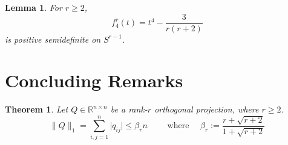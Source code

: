 \documentclass[10pt,a4paper]{amsart}
\newtheorem{lemma}{Lemma}
\newtheorem{theorem}{Theorem}
\newcommand{\R}{\mathbb{R}}
\newcommand{\abs}[1]{\lvert #1\rvert}
\begin{document}
\begin{lemma}\label{lem:psd4}
For $r \geq 2$,
\[
f_4^r(t)=t^4-\frac{3}{r(r+2)}
\]
is positive semidefinite on \(S^{r-1}\).
\end{lemma}

\section{Concluding Remarks}\label{sec5}

\begin{theorem}\label{thm:l1-proj}
Let \(Q\in \R^{n\times n}\) be a rank-\(r\) orthogonal projection, where \(r\ge 2\). 
\[
\|Q\|_1=\sum_{i,j=1}^n \abs{q_{ij}}
\le \beta_r n \qquad \text{ where } \quad \beta_r:=\frac{r+\sqrt{r+2}}{1+\sqrt{r+2}}
\]
\end{theorem}
\end{document}
